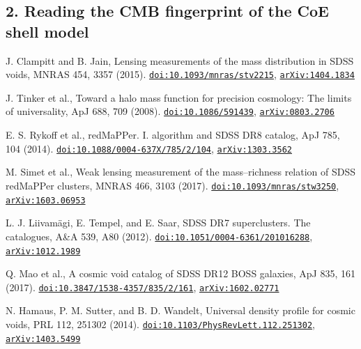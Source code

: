 \documentclass[11pt,a4paper]{article}
\begin{document}
\subsection*{2. Reading the CMB fingerprint of the CoE shell model}
\begin{description}[leftmargin=2.6em,labelwidth=2.2em,labelsep=0.4em,itemsep=1pt,parsep=0pt,font=\normalfont]
\item[{[1]}] J. Clampitt and B. Jain, Lensing measurements of the mass distribution in SDSS voids, MNRAS 454, 3357 (2015). \href{https://doi.org/10.1093/mnras/stv2215}{\nolinkurl{doi:10.1093/mnras/stv2215}}, \href{https://arxiv.org/abs/1404.1834}{\nolinkurl{arXiv:1404.1834}}
\item[{[2]}] J. Tinker et al., Toward a halo mass function for precision cosmology: The limits of universality, ApJ 688, 709 (2008). \href{https://doi.org/10.1086/591439}{\nolinkurl{doi:10.1086/591439}}, \href{https://arxiv.org/abs/0803.2706}{\nolinkurl{arXiv:0803.2706}}
\item[{[3]}] E. S. Rykoff et al., redMaPPer. I. algorithm and SDSS DR8 catalog, ApJ 785, 104 (2014). \href{https://doi.org/10.1088/0004-637X/785/2/104}{\nolinkurl{doi:10.1088/0004-637X/785/2/104}}, \href{https://arxiv.org/abs/1303.3562}{\nolinkurl{arXiv:1303.3562}}
\item[{[4]}] M. Simet et al., Weak lensing measurement of the mass–richness relation of SDSS redMaPPer clusters, MNRAS 466, 3103 (2017). \href{https://doi.org/10.1093/mnras/stw3250}{\nolinkurl{doi:10.1093/mnras/stw3250}}, \href{https://arxiv.org/abs/1603.06953}{\nolinkurl{arXiv:1603.06953}}
\item[{[5]}] L. J. Liivamägi, E. Tempel, and E. Saar, SDSS DR7 superclusters. The catalogues, A\&A 539, A80 (2012). \href{https://doi.org/10.1051/0004-6361/201016288}{\nolinkurl{doi:10.1051/0004-6361/201016288}}, \href{https://arxiv.org/abs/1012.1989}{\nolinkurl{arXiv:1012.1989}}
\item[{[6]}] Q. Mao et al., A cosmic void catalog of SDSS DR12 BOSS galaxies, ApJ 835, 161 (2017). \href{https://doi.org/10.3847/1538-4357/835/2/161}{\nolinkurl{doi:10.3847/1538-4357/835/2/161}}, \href{https://arxiv.org/abs/1602.02771}{\nolinkurl{arXiv:1602.02771}}
\item[{[7]}] N. Hamaus, P. M. Sutter, and B. D. Wandelt, Universal density profile for cosmic voids, PRL 112, 251302 (2014). \href{https://doi.org/10.1103/PhysRevLett.112.251302}{\nolinkurl{doi:10.1103/PhysRevLett.112.251302}}, \href{https://arxiv.org/abs/1403.5499}{\nolinkurl{arXiv:1403.5499}}

\end{description}
\end{document}
